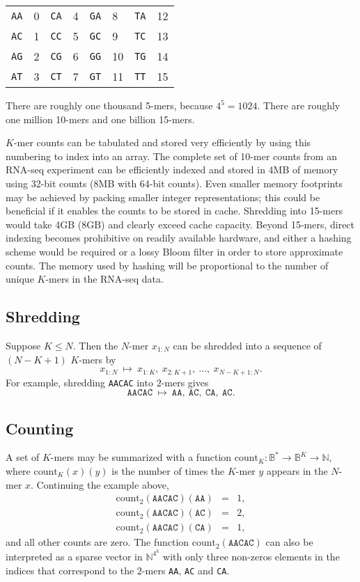 \documentclass[11pt]{article}
\begin{document}
\begin{center}
\begin{tabular}{ll|ll|ll|ll}
  \texttt{AA} & 0 & \texttt{CA} & 4 &   \texttt{GA} & 8 & \texttt{TA} & 12
  \\
  \texttt{AC} & 1 & \texttt{CC} & 5 &   \texttt{GC} & 9 & \texttt{TC} & 13
  \\
  \texttt{AG} & 2 & \texttt{CG} & 6 &   \texttt{GG} & 10 & \texttt{TG} & 14
  \\
  \texttt{AT} & 3 & \texttt{CT} & 7 &   \texttt{GT} & 11 & \texttt{TT} & 15
\end{tabular}
\end{center}
There are roughly one thousand 5-mers, because $4^5 = 1024$.  There are
roughly one million 10-mers and one billion 15-mers.

$K$-mer counts can be tabulated and stored very efficiently by using
this numbering to index into an array.  The complete set of 10-mer
counts from an RNA-seq experiment can be efficiently indexed and
stored in 4MB of memory using 32-bit counts (8MB with 64-bit counts).
Even smaller memory footprints may be achieved by packing smaller
integer representations; this could be beneficial if it enables the
counts to be stored in cache.  Shredding into 15-mers would take 4GB
(8GB) and clearly exceed cache capacity.  Beyond 15-mers, direct
indexing becomes prohibitive on readily available hardware, and either
a hashing scheme would be required or a lossy Bloom filter in order to
store approximate counts.  The memory used by hashing will be
proportional to the number of unique $K$-mers in the RNA-seq data.

\subsection{Shredding}
Suppose $K \leq N$.  Then the $N$-mer $x_{1:N}$ can be shredded into
a sequence of $(N - K + 1)$ $K$-mers by
\[
  x_{1:N} \ \mapsto \
  x_{1:K}, \ x_{2:K+1}, \ \ldots, \ x_{N-K+1:N}.
\]
For example, shredding   \texttt{AACAC}  into $2$-mers gives
\[
  \texttt{AACAC} \ \mapsto \
  \texttt{AA}, \ \texttt{AC}, \ \texttt{CA}, \ \texttt{AC}.
\]


\subsection{Counting}
A set of $K$-mers may be summarized with a function
$\textrm{count}_K:\mathbb{B}^* \rightarrow \mathbb{B}^K \rightarrow
\mathbb{N}$, where
$\textrm{count}_K(x)(y)$ is the number of times the $K$-mer
$y$ appears in the $N$-mer $x$.  Continuing the example above,
\begin{eqnarray*}
  \textrm{count}_2(\texttt{AACAC})(\texttt{AA}) & = & 1,
  \\
  \textrm{count}_2(\texttt{AACAC})(\texttt{AC}) & = & 2,
  \\
  \textrm{count}_2(\texttt{AACAC})(\texttt{CA}) & = & 1,
\end{eqnarray*}
and all other counts are zero. The function $ \textrm{count}_2(\texttt{AACAC}) $ can also be interpreted as a sparse vector in $\mathbb{N}^{4^k}$ with only three non-zeros elements in the indices that correspond to the $2$-mers \texttt{AA}, \texttt{AC} and \texttt{CA}.
\end{document}

